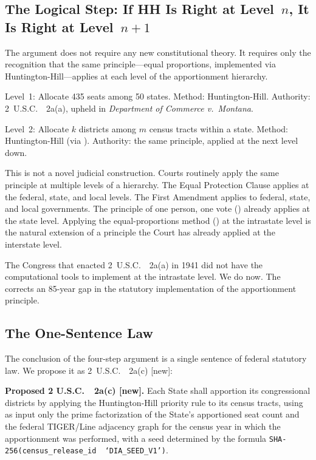 \subsection{The Logical Step: If HH Is Right at Level~$n$, It Is Right at Level~$n+1$}

The argument does not require any new constitutional theory.
It requires only the recognition that the same principle---equal proportions,
implemented via Huntington-Hill---applies at each level of the apportionment
hierarchy.

Level~1: Allocate 435 seats among 50 states.
Method: Huntington-Hill.
Authority: 2~U.S.C.~\usca{}~2a(a), upheld in \textit{Department of Commerce
v.\ Montana}.

Level~2: Allocate $k$ districts among $m$ census tracts within a state.
Method: Huntington-Hill (via \ar{}).
Authority: the same principle, applied at the next level down.

This is not a novel judicial construction.
Courts routinely apply the same principle at multiple levels of a hierarchy.
The Equal Protection Clause applies at the federal, state, and local levels.
The First Amendment applies to federal, state, and local governments.
The principle of one person, one vote (\wesberry{}) already applies at the
state level.
Applying the equal-proportions method (\hh{}) at the intrastate level
is the natural extension of a principle the Court has already applied
at the interstate level.

The Congress that enacted 2~U.S.C.~\usca{}~2a(a) in 1941 did not have the
computational tools to implement \hh{} at the intrastate level.
We do now.
The \dia{} corrects an 85-year gap in the statutory implementation of the
apportionment principle.

\subsection{The One-Sentence Law}

The conclusion of the four-step argument is a single sentence of federal
statutory law.
We propose it as 2~U.S.C.~\usca{}~2a(c) [new]:

\begin{statute}
\noindent\textbf{Proposed 2 U.S.C.\ \usca{}\ 2a(c) [new].}
Each State shall apportion its congressional districts by applying the
Huntington-Hill priority rule to its census tracts, using as input only
the prime factorization of the State's apportioned seat count and the
federal TIGER/Line adjacency graph for the census year in which the
apportionment was performed, with a seed determined by the formula
\texttt{SHA-256(census\_release\_id \textbar\textbar\ `DIA\_SEED\_V1')}.
\end{statute}

